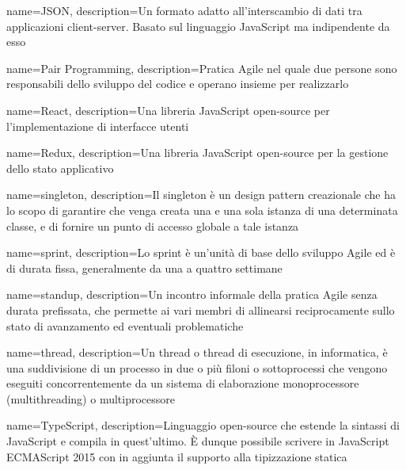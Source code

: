 {
    name=JSON,
    description={Un formato adatto all'interscambio di dati tra applicazioni client-server. Basato sul linguaggio JavaScript ma indipendente da esso}
}

{
    name=Pair Programming,
    description={Pratica Agile nel quale due persone sono responsabili dello sviluppo del codice e operano insieme per realizzarlo}
}

{
    name=React,
    description={Una libreria JavaScript open-source per l'implementazione di interfacce utenti}
}

{
    name=Redux,
    description={Una libreria JavaScript open-source per la gestione dello stato applicativo}
}

{
    name=singleton,
    description={Il singleton è un design pattern creazionale che ha lo scopo di garantire che venga creata una e una sola istanza di una determinata classe, e di fornire un punto di accesso globale a tale istanza}
}

{
    name=sprint,
    description={Lo sprint è un'unità di base dello sviluppo Agile ed è di durata fissa, generalmente da una a quattro settimane}
}

{
    name=standup,
    description={Un incontro informale della pratica Agile senza durata prefissata, che permette ai vari membri di allinearsi reciprocamente sullo stato di avanzamento ed eventuali problematiche}
}

{
    name=thread,
    description={Un thread o thread di esecuzione, in informatica, è una suddivisione di un processo in due o più filoni o sottoprocessi che vengono eseguiti concorrentemente da un sistema di elaborazione monoprocessore (multithreading) o multiprocessore}
}

{
    name=TypeScript,
    description={Linguaggio open-source che estende la sintassi di JavaScript e compila in quest'ultimo. È dunque possibile scrivere in JavaScript ECMAScript 2015 con in aggiunta il supporto alla tipizzazione statica}
}

